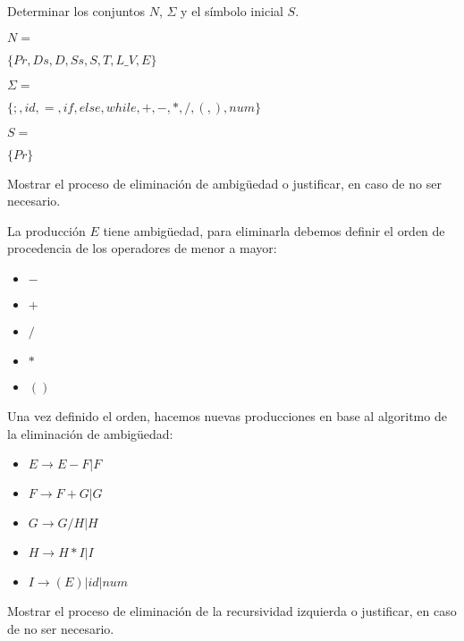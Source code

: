 \documentclass[letterpaper,12pt,titlepage]{article}
\begin{document}
\begin{enumerate}
{\bfseries \item \boldmath Determinar los conjuntos $N$, $\Sigma$ y el símbolo inicial $S$.}
\begin{itemize}
    {\bfseries \item \boldmath $N = $} $\{Pr, Ds, D, Ss, S, T, L\_V, E\}$
    {\bfseries \item \boldmath $\Sigma = $} $\{;, id, =, if, else, while, +, -, *, /, (, ), num\}$
    {\bfseries \item \boldmath $S = $} $\{Pr\}$
\end{itemize}
{\bfseries \item \boldmath Mostrar el proceso de eliminación de ambigüedad o justificar, en caso de no ser necesario.}

La producción $E$ tiene ambigüedad, para eliminarla debemos definir el orden de procedencia de los operadores de menor a mayor:
\begin{itemize}
    \item $-$
    \item $+$
    \item $/$
    \item $*$
    \item $()$
\end{itemize}
Una vez definido el orden, hacemos nuevas producciones en base al algoritmo de la eliminación de ambigüedad:
\begin{itemize}
    \item $E\rightarrow E-F|F$
    \item $F\rightarrow F+G|G$
    \item $G\rightarrow G/H|H$
    \item $H\rightarrow H*I|I$
    \item $I\rightarrow (E)|id|num$
\end{itemize}
{\bfseries \item \boldmath 
Mostrar el proceso de eliminación de la recursividad izquierda o justificar, en caso de no ser necesario.}


\end{enumerate}
\end{document}
